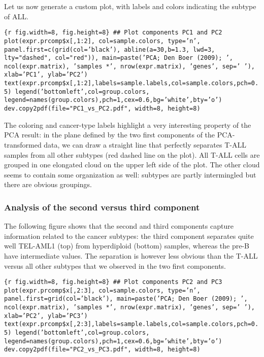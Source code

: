 Let us now generate a custom plot, with labels and colors indicating the
subtype of ALL.

\texttt{\{r fig.width=8, fig.height=8\} \#\# Plot components PC1 and PC2 plot(expr.prcomp\$x{[},1:2{]},        col=sample.colors,        type='n',        panel.first=c(grid(col='black'), abline(a=30,b=1.3, lwd=3, lty="dashed", col="red")),          main=paste('PCA; Den Boer (2009); ',            ncol(expr.matrix), 'samples *', nrow(expr.matrix), 'genes', sep=' '),           xlab='PC1', ylab='PC2') text(expr.prcomp\$x{[},1:2{]},labels=sample.labels,col=sample.colors,pch=0.5) legend('bottomleft',col=group.colors,           legend=names(group.colors),pch=1,cex=0.6,bg='white',bty='o') dev.copy2pdf(file="PC1\_vs\_PC2.pdf", width=8, height=8)}

The coloring and cancer-type labels highlight a very interesting
property of the PCA result: in the plane defined by the two first
components of the PCA-transformed data, we can draw a straight line that
perfectly separates T-ALL samples from all other subtypes (red dashed
line on the plot). All T-ALL cells are grouped in one elongated cloud on
the upper left side of the plot. The other cloud seems to contain some
organization as well: subtypes are partly intermingled but there are
obvious groupings.

\subsubsection{Analysis of the second versus third
component}\label{analysis-of-the-second-versus-third-component}

The following figure shows that the second and third components capture
information related to the cancer subtypes: the third component
separates quite well TEL-AML1 (top) from hyperdiploid (bottom) samples,
whereas the pre-B have intermediate values. The separation is however
less obvious than the T-ALL versus all other subtypes that we observed
in the two first components.

\texttt{\{r fig.width=8, fig.height=8\} \#\# Plot components PC2 and PC3 plot(expr.prcomp\$x{[},2:3{]},        col=sample.colors,        type='n',        panel.first=grid(col='black'),           main=paste('PCA; Den Boer (2009); ',            ncol(expr.matrix), 'samples *', nrow(expr.matrix), 'genes', sep=' '),           xlab='PC2', ylab='PC3') text(expr.prcomp\$x{[},2:3{]},labels=sample.labels,col=sample.colors,pch=0.5)      legend('bottomleft',col=group.colors,           legend=names(group.colors),pch=1,cex=0.6,bg='white',bty='o') dev.copy2pdf(file="PC2\_vs\_PC3.pdf", width=8, height=8)}

